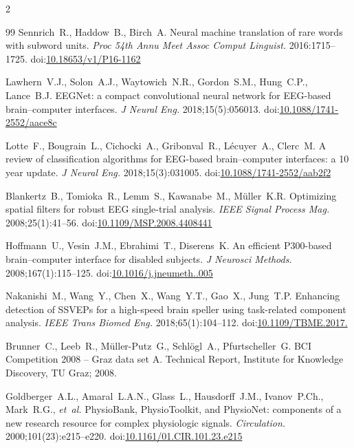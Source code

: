 \documentclass[14pt,a4paper]{extarticle}
\begin{document}
\begin{multicols}{2}
\begin{thebibliography}{99}
Sennrich~R., Haddow~B., Birch~A.
Neural machine translation of rare words with subword units.
\textit{Proc 54th Annu Meet Assoc Comput Linguist.} 2016:1715--1725.
doi:\href{https://doi.org/10.18653/v1/P16-1162}{10.18653/v1/P16-1162}

Lawhern~V.J., Solon~A.J., Waytowich~N.R., Gordon~S.M., Hung~C.P., Lance~B.J.
EEGNet: a compact convolutional neural network for EEG-based brain--computer interfaces.
\textit{J Neural Eng.} 2018;15(5):056013.
doi:\href{https://doi.org/10.1088/1741-2552/aace8c}{10.1088/1741-2552/aace8c}

Lotte~F., Bougrain~L., Cichocki~A., Gribonval~R., L\'ecuyer~A., Clerc~M.
A review of classification algorithms for EEG-based brain--computer interfaces: a 10 year update.
\textit{J Neural Eng.} 2018;15(3):031005.
doi:\href{https://doi.org/10.1088/1741-2552/aab2f2}{10.1088/1741-2552/aab2f2}

Blankertz~B., Tomioka~R., Lemm~S., Kawanabe~M., Müller~K.R.
Optimizing spatial filters for robust EEG single-trial analysis.
\textit{IEEE Signal Process Mag.} 2008;25(1):41--56.
doi:\href{https://doi.org/10.1109/MSP.2008.4408441}{10.1109/MSP.2008.4408441}

Hoffmann~U., Vesin~J.M., Ebrahimi~T., Diserens~K.
An efficient P300-based brain--computer interface for disabled subjects.
\textit{J Neurosci Methods.} 2008;167(1):115--125.
doi:\href{https://doi.org/10.1016/j.jneumeth.2007.03.005}{10.1016/\allowbreak j.jneumeth..005}

Nakanishi~M., Wang~Y., Chen~X., Wang~Y.T., Gao~X., Jung~T.P.
Enhancing detection of SSVEPs for a high-speed brain speller using task-related component analysis.
\textit{IEEE Trans Biomed Eng.} 2018;65(1):104--112.
doi:\href{https://doi.org/10.1109/TBME.2017.2694818}{10.1109/\allowbreak TBME.2017.}

Brunner~C., Leeb~R., Müller-Putz~G., Schlögl~A., Pfurtscheller~G.
BCI Competition 2008 -- Graz data set A.
Technical Report, Institute for Knowledge Discovery, TU Graz; 2008.

Goldberger~A.L., Amaral~L.A.N., Glass~L., Hausdorff~J.M., Ivanov~P.Ch., Mark~R.G.,
\textit{et~al.}
PhysioBank, PhysioToolkit, and PhysioNet: components of a new research resource
for complex physiologic signals.
\textit{Circulation.} 2000;101(23):e215--e220.
doi:\href{https://doi.org/10.1161/01.CIR.101.23.e215}{10.1161/01.CIR.101.23.e215}


\end{thebibliography}
\end{multicols}
\end{document}
